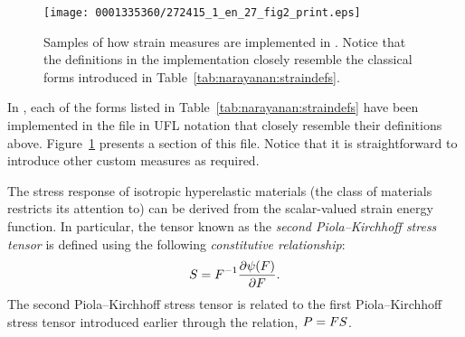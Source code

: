 \begin{figure}[!t]
\texttt{[image: 0001335360/272415\_1\_en\_27\_fig2\_print.eps]}
\caption{Samples of how strain measures are implemented in
  \twist. Notice that the definitions in the implementation closely
  resemble the classical forms introduced in
  Table~\ref{tab:narayanan:straindefs}.}
\label{code:narayanan:kinematics.py}
\end{figure}

In \twist, each of the forms listed in
Table~\ref{tab:narayanan:straindefs} have been implemented in the file
 in UFL notation that closely resemble their
definitions above. Figure~\ref{code:narayanan:kinematics.py} presents
a section of this file. Notice that it is straightforward to introduce
other custom measures as required.

The stress response of isotropic hyperelastic materials (the class of
materials \twist{} restricts its attention to) can be derived from the
scalar-valued strain energy function. In particular, the tensor known
as the {\em second Piola--Kirchhoff stress tensor} is defined using the
following {\em constitutive relationship}:
\begin{equation}
  \mbox{$ S$} = \mbox{$ F$}^{-1} \frac{\partial \psi(\mbox{$ F$})}{\partial \mbox{$ F$}}.
\end{equation}
The second Piola--Kirchhoff stress tensor is related to the first
Piola--Kirchhoff stress tensor introduced earlier through the relation,
$\mbox{$ P$} = \mbox{$ F$} \mbox{$ S$}$.

